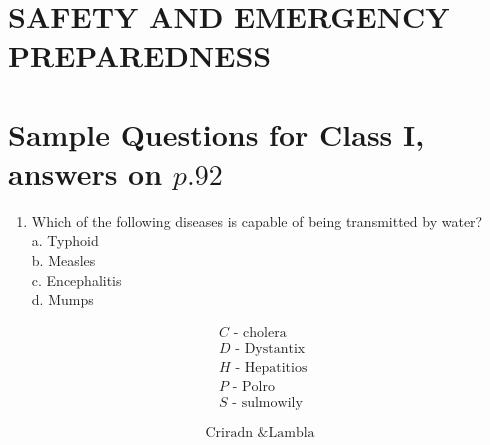 \documentclass[10pt]{article}
\begin{document}
\section{SAFETY AND EMERGENCY PREPAREDNESS}
\section{Sample Questions for Class I, answers on $p .92$}
\begin{enumerate}
  \item Which of the following diseases is capable of being transmitted by water?\\
a. Typhoid\\
b. Measles\\
c. Encephalitis\\
d. Mumps
\end{enumerate}

$$
\begin{aligned}
&C \text { - cholera } \\
&D \text { - Dystantix } \\
&H \text { - Hepatitios } \\
&P \text { - Polro } \\
&S \text { - sulmowily }
\end{aligned}
$$

$$
\text { Criradn \& Lambla }
$$
\end{document}
